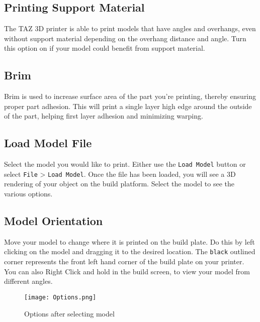 \subsection{Printing Support Material}
The TAZ 3D printer is able to print models that have angles and overhangs, even without support material depending on the overhang distance and angle. Turn this option on if your model could benefit from support material.

\subsection{Brim}
Brim is used to increase surface area of the part you're printing, thereby ensuring proper part adhesion. This will print a single layer high edge around the outside of the part, helping first layer adhesion and minimizing warping.

\subsection{Load Model File}
Select the model you would like to print. Either use the \texttt{Load Model} button or select \texttt{File} > \texttt{Load Model}. Once the file has been loaded, you will see a 3D rendering of your object on the build platform. Select the model to see the various options. 

\subsection{Model Orientation}
Move your model to change where it is printed on the build plate. Do this by left clicking on the model and dragging it to the desired location. The \texttt{black} outlined corner represents the front left hand corner of the build plate on your printer. You can also Right Click and hold in the build screen, to view your model from different angles. %
\begin{figure}[H]
\centering
\texttt{[image: Options.png]}
\caption{Options after selecting model}
\label{fig:Orientation}
\end{figure}

